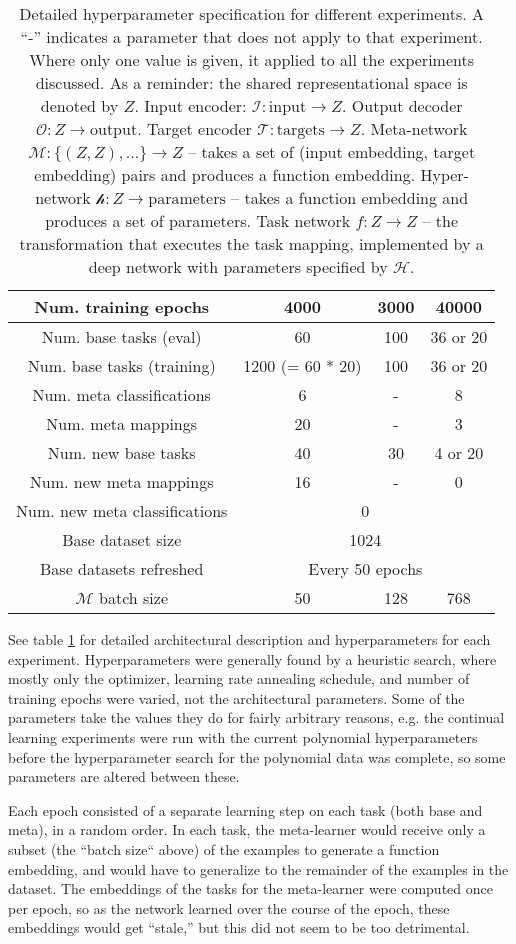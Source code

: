 \documentclass{article}
\begin{document}
\begin{table}
\begin{tabular}{|c|ccc|}
Num. training epochs & 4000 & 3000 & 40000 \\
\hline
Num. base tasks (eval) & 60 & 100 & 36 or 20 \\
Num. base tasks (training) & 1200 (= 60 * 20) & 100 & 36 or 20  \\
Num. meta classifications & 6 & - & 8  \\
Num. meta mappings & 20 & - & 3  \\
Num. new base tasks & 40 & 30 & 4 or 20 \\ 
Num. new meta mappings & 16 & - & 0  \\
Num. new meta classifications &  \multicolumn{3}{c|}{0} \\
Base dataset size & \multicolumn{3}{c|}{1024} \\
Base datasets refreshed & \multicolumn{3}{c|}{Every 50 epochs} \\
$\mathcal{M}$ batch size & 50 & 128 & 768 \\
\hline
\end{tabular}
\caption{Detailed hyperparameter specification for different experiments. A ``-'' indicates a parameter that does not apply to that experiment. Where only one value is given, it applied to all the experiments discussed. As a reminder: the shared representational space is denoted by $Z$. Input encoder: $\mathcal{I}: \text{input} \rightarrow Z$. Output decoder $\mathcal{O}: Z \rightarrow \text{output}$. Target encoder $\mathcal{T}: \text{targets} \rightarrow Z$. Meta-network $\mathcal{M}: \{(Z, Z), ...\} \rightarrow Z $ -- takes a set of (input embedding, target embedding) pairs and produces a function embedding. Hyper-network $\mathcal{h}: Z \rightarrow \text{parameters}$ -- takes a function embedding and produces a set of parameters. Task network $f: Z \rightarrow Z$ -- the transformation that executes the task mapping, implemented by a deep network with parameters specified by $\mathcal{H}$.} \label{supp_hyperparameter_table}
\end{table}
See table \ref{supp_hyperparameter_table} for detailed architectural description and hyperparameters for each experiment. Hyperparameters were generally found by a heuristic search, where mostly only the optimizer, learning rate annealing schedule, and number of training epochs were varied, not the architectural parameters. Some of the parameters take the values they do for fairly arbitrary reasons, e.g. the continual learning experiments were run with the current polynomial hyperparameters before the hyperparameter search for the polynomial data was complete, so some parameters are altered between these. \par
Each epoch consisted of a separate learning step on each task (both base and meta), in a random order. In each task, the meta-learner would receive only a subset (the ``batch size`` above) of the examples to generate a function embedding, and would have to generalize to the remainder of the examples in the dataset. The embeddings of the tasks for the meta-learner were computed once per epoch, so as the network learned over the course of the epoch, these embeddings would get ``stale,'' but this did not seem to be too detrimental. \par 
\end{document}

